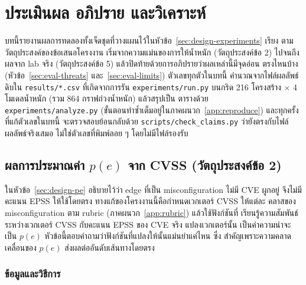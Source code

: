 \chapter{ประเมินผล อภิปราย และวิเคราะห์}\label{ch:eval}

บทนี้รายงานผลการทดลองทั้งเจ็ดชุดที่วางแผนไว้ในหัวข้อ~\ref{sec:design-experiments} เรียง
ตามวัตถุประสงค์ของข้อเสนอโครงงาน เริ่มจากความแม่นของการให้น้ำหนัก (วัตถุประสงค์ข้อ 2)
ไปจนถึงผลจาก lab จริง (วัตถุประสงค์ข้อ 5) แล้วปิดท้ายด้วยการอภิปรายว่าผลเหล่านี้มีจุดอ่อน
ตรงไหนบ้าง (หัวข้อ~\ref{sec:eval-threats} และ~\ref{sec:eval-limits}) ตัวเลขทุกตัวในบทนี้
คำนวณจากไฟล์ผลลัพธ์ดิบใน \texttt{results/*.csv} ที่เกิดจากการรัน \texttt{experiments/run.py}
บนกริด 216 โครงสร้าง $\times$ 4 โมเดลน้ำหนัก (รวม 864 กราฟถ่วงน้ำหนัก) แล้วสรุปเป็น
ตารางด้วย \texttt{experiments/analyze.py} (ขั้นตอนทำซ้ำเต็มอยู่ในภาคผนวก~\ref{app:reproduce})
และทุกครั้งที่แก้ตัวเลขในบทนี้ จะตรวจสอบย้อนกลับด้วย \texttt{scripts/check\_claims.py}
ว่ายังตรงกับไฟล์ผลลัพธ์จริงเสมอ ไม่ใช่ตัวเลขที่พิมพ์ลอย ๆ โดยไม่มีไฟล์รองรับ

\section{ผลการประมาณค่า $p(e)$ จาก CVSS (วัตถุประสงค์ข้อ 2)}\label{sec:eval-pe}

ในหัวข้อ~\ref{sec:design-pe} อธิบายไว้ว่า edge ที่เป็น misconfiguration ไม่มี CVE ผูกอยู่
จึงไม่มีคะแนน EPSS ให้ใช้โดยตรง ทางแก้ของโครงงานนี้คือกำหนดเวกเตอร์ CVSS ให้แต่ละ
คลาสของ misconfiguration ตาม rubric (ภาคผนวก~\ref{app:rubric}) แล้วใช้ฟังก์ชันที่
เรียนรู้ความสัมพันธ์ระหว่างเวกเตอร์ CVSS กับคะแนน EPSS ของ CVE จริง แปลงเวกเตอร์นั้น
เป็นค่าความน่าจะเป็น $p(e)$ หัวข้อนี้ตอบคำถามว่าฟังก์ชันที่แปลงให้นั้นแม่นยำแค่ไหน ซึ่ง
สำคัญเพราะความคลาดเคลื่อนของ $p(e)$ ส่งผลต่ออันดับเส้นทางโดยตรง

\subsection{ข้อมูลและวิธีการ}\label{sec:eval-pe-data}

